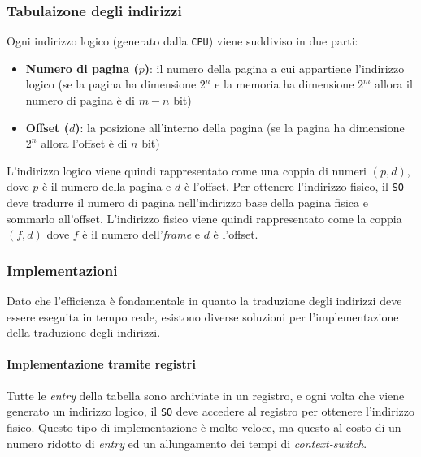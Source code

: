         \subsubsection{Tabulaizone degli indirizzi}
            Ogni indirizzo logico (generato dalla \texttt{CPU}) viene suddiviso in due parti:
            \begin{itemize}
                \item \textbf{Numero di pagina ($p$)}: il numero della pagina a cui appartiene l'indirizzo logico (se la pagina ha dimensione $2^n$ e la memoria ha dimensione $2^m$ allora il numero di pagina è di $m-n$ bit)
                \item \textbf{Offset ($d$)}: la posizione all'interno della pagina (se la pagina ha dimensione $2^n$ allora l'offset è di $n$ bit)
            \end{itemize}
            L'indirizzo logico viene quindi rappresentato come una coppia di numeri $(p,d)$, dove $p$ è il numero della pagina e $d$ è l'offset. Per ottenere l'indirizzo fisico, il \texttt{SO} deve tradurre il numero di pagina nell'indirizzo base della pagina fisica e sommarlo all'offset. L'indirizzo fisico viene quindi rappresentato come la coppia $(f,d)$ dove $f$ è il numero dell'\textit{frame} e $d$ è l'offset.
        \subsubsection{Implementazioni} 
            Dato che l'efficienza è fondamentale in quanto la traduzione degli indirizzi deve essere eseguita in tempo reale, esistono diverse soluzioni per l'implementazione della traduzione degli indirizzi.
            \paragraph{Implementazione tramite registri}    
                Tutte le \textit{entry} della tabella sono archiviate in un registro, e ogni volta che viene generato un indirizzo logico, il \texttt{SO} deve accedere al registro per ottenere l'indirizzo fisico. Questo tipo di implementazione è molto veloce, ma questo al costo di un numero ridotto di \textit{entry} ed un allungamento dei tempi di \textit{context-switch}.
